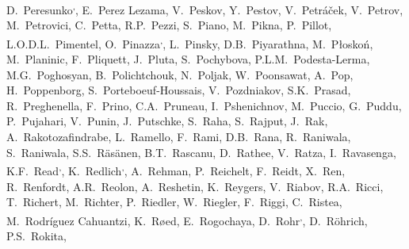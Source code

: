 \begin{flushleft}
D.~Peresunko\textsuperscript{,}\And, 
E.~Perez Lezama\And, 
V.~Peskov\And, 
Y.~Pestov\And, 
V.~Petr\'{a}\v{c}ek\And, 
V.~Petrov\And, 
M.~Petrovici\And, 
C.~Petta\And, 
R.P.~Pezzi\And, 
S.~Piano\And, 
M.~Pikna\And, 
P.~Pillot\And, 
L.O.D.L.~Pimentel\And, 
O.~Pinazza\textsuperscript{,}\And, 
L.~Pinsky\And, 
D.B.~Piyarathna\And, 
M.~P\l osko\'{n}\And, 
M.~Planinic\And, 
F.~Pliquett\And, 
J.~Pluta\And, 
S.~Pochybova\And, 
P.L.M.~Podesta-Lerma\And, 
M.G.~Poghosyan\And, 
B.~Polichtchouk\And, 
N.~Poljak\And, 
W.~Poonsawat\And, 
A.~Pop\And, 
H.~Poppenborg\And, 
S.~Porteboeuf-Houssais\And, 
V.~Pozdniakov\And, 
S.K.~Prasad\And, 
R.~Preghenella\And, 
F.~Prino\And, 
C.A.~Pruneau\And, 
I.~Pshenichnov\And, 
M.~Puccio\And, 
G.~Puddu\And, 
P.~Pujahari\And, 
V.~Punin\And, 
J.~Putschke\And, 
S.~Raha\And, 
S.~Rajput\And, 
J.~Rak\And, 
A.~Rakotozafindrabe\And, 
L.~Ramello\And, 
F.~Rami\And, 
D.B.~Rana\And, 
R.~Raniwala\And, 
S.~Raniwala\And, 
S.S.~R\"{a}s\"{a}nen\And, 
B.T.~Rascanu\And, 
D.~Rathee\And, 
V.~Ratza\And, 
I.~Ravasenga\And, 
K.F.~Read\textsuperscript{,}\And, 
K.~Redlich\textsuperscript{,}\And, 
A.~Rehman\And, 
P.~Reichelt\And, 
F.~Reidt\And, 
X.~Ren\And, 
R.~Renfordt\And, 
A.R.~Reolon\And, 
A.~Reshetin\And, 
K.~Reygers\And, 
V.~Riabov\And, 
R.A.~Ricci\And, 
T.~Richert\And, 
M.~Richter\And, 
P.~Riedler\And, 
W.~Riegler\And, 
F.~Riggi\And, 
C.~Ristea\And, 
M.~Rodr\'{i}guez Cahuantzi\And, 
K.~R{\o}ed\And, 
E.~Rogochaya\And, 
D.~Rohr\textsuperscript{,}\And, 
D.~R\"ohrich\And, 
P.S.~Rokita\And, 

\end{flushleft}
